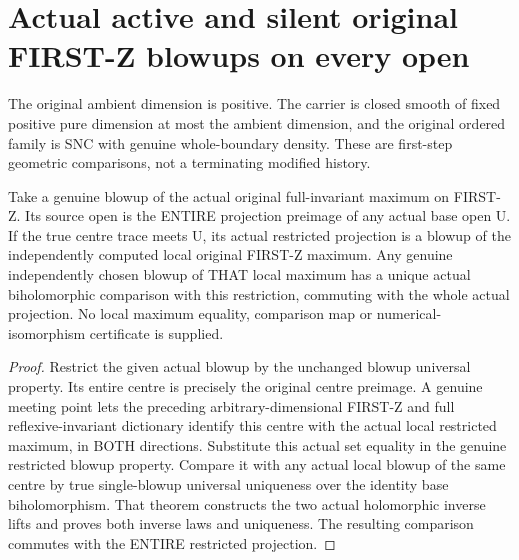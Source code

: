 \section{Actual active and silent original FIRST-Z blowups on every open}

The original ambient dimension is positive. The carrier is closed smooth
of fixed positive pure dimension at most the ambient dimension, and the
original ordered family is SNC with genuine whole-boundary density. These
are first-step geometric comparisons, not a terminating modified history.

\begin{theorem}
\label{hir:sharp-original-first-blowup-active-open-comparison}
\leanok
Take a genuine blowup of the actual original full-invariant maximum on
FIRST-Z. Its source open is the ENTIRE projection preimage of any actual
base open U. If the true centre trace meets U, its actual restricted
projection is a blowup of the independently computed local original
FIRST-Z maximum. Any genuine independently chosen blowup of THAT local
maximum has a unique actual biholomorphic comparison with this restriction,
commuting with the whole actual projection. No local maximum equality,
comparison map or numerical-isomorphism certificate is supplied.
\end{theorem}
\begin{proof}
Restrict the given actual blowup by the unchanged blowup universal property.
Its entire centre is precisely the original centre preimage. A genuine
meeting point lets the preceding arbitrary-dimensional FIRST-Z and full
reflexive-invariant dictionary identify this centre with the actual local
restricted maximum, in BOTH directions. Substitute this actual set equality
in the genuine restricted blowup property. Compare it with any actual local
blowup of the same centre by true single-blowup universal uniqueness over
the identity base biholomorphism. That theorem constructs the two actual
holomorphic inverse lifts and proves both inverse laws and uniqueness.
The resulting comparison commutes with the ENTIRE restricted projection.
\end{proof}

